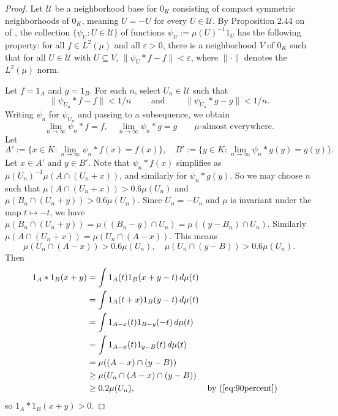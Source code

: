 \documentclass[12pt]{amsart} \usepackage{amsmath,centernot,amssymb,leftindex}
\numberwithin{theorem}{section}
\numberwithin{equation}{section}
\theoremstyle{definition}
\begin{document}
\begin{proof} Let $\mathcal U$ be a neighborhood base for $0_K$ consisting of compact symmetric neighborhoods of $0_K$, meaning $U=-U$ for every $U\in \mathcal U$. By Proposition 2.44 on of \cite[p.58]{Folland_CourseInAHA}, the collection $\{\psi_{U}:U\in \mathcal U\}$ of functions $\psi_U:=\mu(U)^{-1}1_{U}$ has the following property: for all $f\in L^2(\mu)$ and all $\varepsilon>0$, there is a neighborhood $V$ of $0_K$ such that for all $U\in \mathcal U$ with $U\subseteq V$, $\|\psi_{U}* f - f\|<\varepsilon$, where $\|\cdot\|$ denotes the $L^2(\mu)$ norm.
	
	
Let $f=1_A$ and $g=1_B$.	For each $n$, select $U_{n}\in \mathcal U$ such that
	\[\|\psi_{U_{n}}*f-f\|<1/n \qquad \text{ and } \qquad \|\psi_{U_{n}}*g-g\|<1/n.\]  Writing $\psi_{n}$  for $\psi_{U_{n}}$ and passing to a subsequence, we obtain 
	\begin{equation}\label{eq:ApproxIDae}
		\lim_{n\to\infty} \psi_{n}*f=f, \quad \lim_{n\to\infty} \psi_{n}*g=g \qquad \mu\text{-almost everywhere.}
	\end{equation}
	Let 
	\[A':=\{x\in K: \lim_{n\to\infty} \psi_{n}*f(x)=f(x)\}, \quad B':=\{y\in K:  \lim_{n\to\infty} \psi_{n}*g(y)=g(y)\}.\]	
	Let $x\in A'$ and $y\in B'$.  Note that $\psi_{n}*f(x)$ simplifies as $\mu(U_n)^{-1} \mu(A\cap(U_n+x))$, and similarly for $\psi_{n}*g(y)$.   So we may choose $n$ such that $\mu(A\cap (U_n+x))>0.6 \mu(U_n)$ and $\mu(B_n\cap (U_n+y))>0.6 \mu(U_n)$.  Since $U_{n}=-U_{n}$ and $\mu$ is invariant under the map $t\mapsto -t$, we have $\mu(B_{n}\cap (U_{n}+y))=\mu((B_{n}-y)\cap U_{n})=\mu((y-B_{n})\cap U_{n})$.  Similarly $\mu(A\cap (U_{n}+x))=\mu(U_{n}\cap (A-x))$. 	This means
	\begin{equation}\label{eq:90percent}
		\mu(U_n\cap (A-x)) > 0.6\mu(U_n),\quad \mu(U_n\cap (y-B)) > 0.6\mu(U_n).
	\end{equation}
	Then
	\begin{align*}
		1_A*1_B(x+y) &= \int 1_A(t)1_B(x+y-t)\, d\mu(t)\\
		&=  \int 1_A(t+x) 1_B(y-t)\, d\mu(t) && \\
		&= \int 1_{A-x}(t) 1_{B-y}(-t)\, d\mu(t)\\
		&= \int 1_{A-x}(t) 1_{y-B}(t)\, d\mu(t)\\
		&= \mu((A-x)\cap (y-B))\\
		&\geq \mu(U_n\cap (A-x)\cap (y-B))\\
		&\geq 0.2\mu(U_n),  && \text{by } (\ref{eq:90percent})
	\end{align*}
	so $1_A*1_B(x+y)>0$.
\end{proof}
\end{document}
